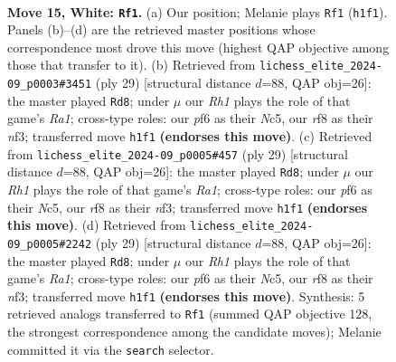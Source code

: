 \documentclass[11pt]{article}
\begin{document}
\begin{figure}[p]
\label{fig:thought-m26}
\end{figure}

\clearpage

\begin{figure}[p]\centering
\begin{subfigure}{0.46\textwidth}\centering
\resizebox{\linewidth}{!}{%
\newchessgame
\chessboard[
  setfen={rn3r2/pppb1kb1/5pp1/4p2p/2P1P3/2N1BN2/PP3PP1/1R1BK2R w K - 0 15},
  showmover=false,
  pgfstyle=straightmove, color=movearrow, markmove={h1-f1}
]}
\caption{}
\end{subfigure}\hfill
\begin{subfigure}{0.46\textwidth}\centering
\resizebox{\linewidth}{!}{%
\newchessgame
\chessboard[
  setfen={r3k2r/2p1bppp/p3b3/1pn1P3/8/5N2/PPB2PPP/R1BR2K1 b kq - 0 15},
  showmover=false,
  pgfstyle=straightmove, color=movearrow, markmove={a8-d8}
]}
\caption{}
\end{subfigure}
\\[4pt]
\begin{subfigure}{0.46\textwidth}\centering
\resizebox{\linewidth}{!}{%
\newchessgame
\chessboard[
  setfen={r3k2r/2p1bppp/p3b3/1pn1P3/8/5N2/PPB2PPP/R1BR2K1 b kq - 0 15},
  showmover=false,
  pgfstyle=straightmove, color=movearrow, markmove={a8-d8}
]}
\caption{}
\end{subfigure}\hfill
\begin{subfigure}{0.46\textwidth}\centering
\resizebox{\linewidth}{!}{%
\newchessgame
\chessboard[
  setfen={r3k2r/2p1bppp/p3b3/1pn1P3/8/5N2/PPB2PPP/R1BR2K1 b kq - 0 15},
  showmover=false,
  pgfstyle=straightmove, color=movearrow, markmove={a8-d8}
]}
\caption{}
\end{subfigure}
\caption{\textbf{Move 15, White: \texttt{Rf1}.} (a) Our position; Melanie plays \texttt{Rf1} (\texttt{h1f1}). Panels (b)--(d) are the retrieved master positions whose correspondence most drove this move (highest QAP objective among those that transfer to it). (b) Retrieved from \texttt{lichess\_elite\_2024-09\_p0003\#3451} (ply 29) [structural distance $d$=88, QAP obj=26]: the master played \texttt{Rd8}; under $\mu$ our \emph{Rh1} plays the role of that game's \emph{Ra1}; cross-type roles: our \emph{p}f6 as their \emph{N}c5, our \emph{r}f8 as their \emph{n}f3; transferred move \texttt{h1f1} \textbf{(endorses this move)}. (c) Retrieved from \texttt{lichess\_elite\_2024-09\_p0005\#457} (ply 29) [structural distance $d$=88, QAP obj=26]: the master played \texttt{Rd8}; under $\mu$ our \emph{Rh1} plays the role of that game's \emph{Ra1}; cross-type roles: our \emph{p}f6 as their \emph{N}c5, our \emph{r}f8 as their \emph{n}f3; transferred move \texttt{h1f1} \textbf{(endorses this move)}. (d) Retrieved from \texttt{lichess\_elite\_2024-09\_p0005\#2242} (ply 29) [structural distance $d$=88, QAP obj=26]: the master played \texttt{Rd8}; under $\mu$ our \emph{Rh1} plays the role of that game's \emph{Ra1}; cross-type roles: our \emph{p}f6 as their \emph{N}c5, our \emph{r}f8 as their \emph{n}f3; transferred move \texttt{h1f1} \textbf{(endorses this move)}. Synthesis: 5 retrieved analogs transferred to \texttt{Rf1} (summed QAP objective 128, the strongest correspondence among the candidate moves); Melanie committed it via the \texttt{search} selector.}

\end{figure}
\end{document}
